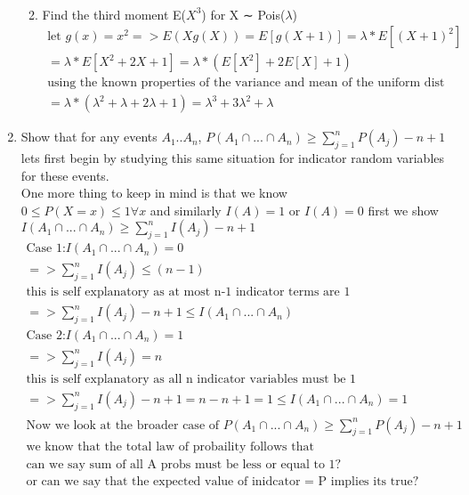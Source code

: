 \documentclass[11pt]{article}
\begin{document}
\begin{enumerate}
\begin{enumerate}
\begin{gather}
	\end{gather}
	\item Find the third moment E($X^3$) for X ∼ Pois($\lambda$)
	\begin{gather}
		\text{let }g(x) = x^2
		=> E(Xg(X))=E[g(X+1)]=\lambda * E[(X+1)^2]\\
		= \lambda * E[X^2 + 2X+1] = \lambda * (E[X^2] + 2E[X] + 1) \\
		\text{using the known properties of the variance and mean of the uniform dist we get}\\
		= \lambda * (\lambda^2 + \lambda + 2\lambda + 1) = \lambda^3 + 3\lambda^2 + \lambda
	\end{gather}
\end{enumerate}
\item Show that for any events $A_1..A_n$,
$P(A_1\cap...\cap A_n) \geq \sum_{j=1}^{n} P(A_j) - n +1$\\
lets first begin by studying this same situation for indicator random variables for these events.\\
One more thing to keep in mind is that we know\\
$0\leq P(X=x)\leq1 \forall x$ and similarly $I(A)=1$ or $I(A)=0$
first we show 	$I(A_1\cap...\cap A_n) \geq \sum_{j=1}^{n} I(A_j) - n +1$
\begin{gather} 
	\text{Case 1:} I(A_1\cap...\cap A_n) = 0\\
	=> \sum_{j=1}^{n} I(A_j) \leq (n-1)\\ 
	\text{this is self explanatory as at most n-1 indicator terms are 1}\\
	=> \sum_{j=1}^{n} I(A_j) - n + 1 \leq I(A_1\cap...\cap A_n)\\
	\text{Case 2:} I(A_1\cap...\cap A_n) = 1\\
	=> \sum_{j=1}^{n} I(A_j) = n\\ 
	\text{this is self explanatory as all n indicator variables must be 1}\\
	=> \sum_{j=1}^{n} I(A_j) - n + 1 = n-n+1 = 1 \leq I(A_1\cap...\cap A_n) = 1\\
	\text{Now we look at the broader case of } P(A_1\cap...\cap A_n) \geq \sum_{j=1}^{n} P(A_j) - n +1\\
	\text{we know that the total law of probaility follows that }\\
	\text{can we say sum of all A probs must be less or equal to 1?}\\
	\text{or can we say that the expected value of inidcator = P implies its true?}
\end{gather}


\end{enumerate}
\end{document}
